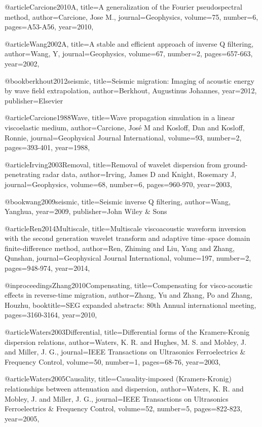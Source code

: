 {@article{Carcione2010A,
  title={A generalization of the Fourier pseudospectral method},
  author={Carcione, Jose M.},
  journal={Geophysics},
  volume={75},
  number={6},
  pages={A53-A56},
  year={2010},
}

@article{Wang2002A,
  title={A stable and efficient approach of inverse {Q} filtering},
  author={Wang, Y},
  journal={Geophysics},
  volume={67},
  number={2},
  pages={657-663},
  year={2002},
}

@book{berkhout2012seismic,
  title={Seismic migration: Imaging of acoustic energy by wave field extrapolation},
  author={Berkhout, Augustinus Johannes},
  year={2012},
  publisher={Elsevier}
}

@article{Carcione1988Wave,
  title={Wave propagation simulation in a linear viscoelastic medium},
  author={Carcione, José M and Kosloff, Dan and Kosloff, Ronnie},
  journal={Geophysical Journal International},
  volume={93},
  number={2},
  pages={393-401},
  year={1988},
}

@article{Irving2003Removal,
  title={Removal of wavelet dispersion from ground-penetrating radar data},
  author={Irving, James D and Knight, Rosemary J},
  journal={Geophysics},
  volume={68},
  number={6},
  pages={960-970},
  year={2003},
}

@book{wang2009seismic,
  title={Seismic inverse {Q} filtering},
  author={Wang, Yanghua},
  year={2009},
  publisher={John Wiley \& Sons}
}

@article{Ren2014Multiscale,
  title={Multiscale viscoacoustic waveform inversion with the second generation wavelet transform and adaptive time–space domain finite-difference method},
  author={Ren, Zhiming and Liu, Yang and Zhang, Qunshan},
  journal={Geophysical Journal International},
  volume={197},
  number={2},
  pages={948-974},
  year={2014},
}

@inproceedings{Zhang2010Compensating,
  title={Compensating for visco-acoustic effects in reverse-time migration},
  author={Zhang, Yu and Zhang, Po and Zhang, Houzhu},
  booktitle={SEG expanded abstracts: 80th Annual international meeting},
  pages={3160-3164},
  year={2010},
}

@article{Waters2003Differential,
  title={Differential forms of the Kramers-Kronig dispersion relations},
  author={Waters, K. R. and Hughes, M. S. and Mobley, J. and Miller, J. G.},
  journal={IEEE Transactions on Ultrasonics Ferroelectrics \& Frequency Control},
  volume={50},
  number={1},
  pages={68-76},
  year={2003},
}

@article{Waters2005Causality,
  title={Causality-imposed (Kramers-Kronig) relationships between attenuation and dispersion},
  author={Waters, K. R. and Mobley, J. and Miller, J. G.},
  journal={IEEE Transactions on Ultrasonics Ferroelectrics \& Frequency Control},
  volume={52},
  number={5},
  pages={822-823},
  year={2005},
}

}

